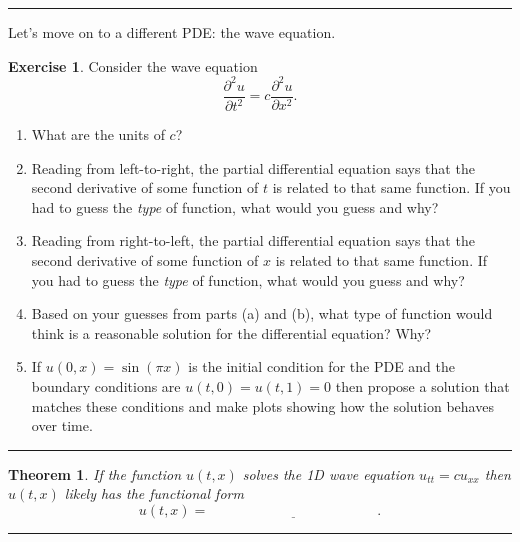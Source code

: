 \documentclass[
]{book}
\providecommand{\tightlist}{%
  \setlength{\itemsep}{0pt}\setlength{\parskip}{0pt}}
\newtheorem{theorem}{Theorem}[chapter]
\theoremstyle{definition}
\theoremstyle{definition}
\theoremstyle{definition}
\newtheorem{exercise}{Exercise}[chapter]
\theoremstyle{remark}
\begin{document}
\begin{center}\rule{0.5\linewidth}{0.5pt}\end{center}

Let's move on to a different PDE: the wave equation.

\begin{exercise}
\protect\hypertarget{exr:unnamed-chunk-532}{}{\label{exr:unnamed-chunk-532} }Consider the wave equation \[\frac{\partial^2 u}{\partial t^2} = c \frac{\partial^2 u}{\partial x^2}.\]

\begin{enumerate}
\def\labelenumi{\alph{enumi}.}
\tightlist
\item
  What are the units of \(c\)?
\item
  Reading from left-to-right, the partial differential equation says that the second derivative of some function of \(t\) is related to that same function. If you had to guess the \emph{type} of function, what would you guess and why?
\item
  Reading from right-to-left, the partial differential equation says that the second derivative of some function of \(x\) is related to that same function. If you had to guess the \emph{type} of function, what would you guess and why?
\item
  Based on your guesses from parts (a) and (b), what type of function would think is a reasonable solution for the differential equation? Why?
\item
  If \(u(0,x) = \sin(\pi x)\) is the initial condition for the PDE and the boundary conditions are \(u(t,0) = u(t,1) = 0\) then propose a solution that matches these conditions and make plots showing how the solution behaves over time.
\end{enumerate}
\end{exercise}

\begin{center}\rule{0.5\linewidth}{0.5pt}\end{center}

\begin{theorem}
\protect\hypertarget{thm:unnamed-chunk-533}{}{\label{thm:unnamed-chunk-533} }If the function \(u(t,x)\) solves the 1D wave equation \(u_{tt} = c u_{xx}\) then \(u(t,x)\) likely has the functional form
\[u(t,x) = \underline{\hspace{2in}}.\]
\end{theorem}

\begin{center}\rule{0.5\linewidth}{0.5pt}\end{center}
\end{document}
